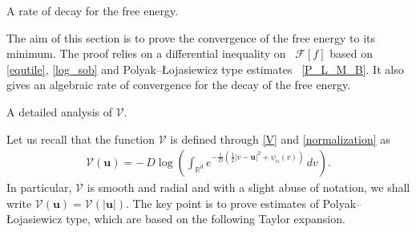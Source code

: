 \documentclass[reqno]{amsart} %
\begin{document}
\begin{section}{A rate of decay for the free energy.}

\label{sec:sec1}
The aim of this section is to prove the convergence of the free energy to its minimum. The proof relies on a differential inequality on ~$\mathcal{F}[f]$ based on ~ \eqref{equtile}, \eqref{log_sob} and Polyak–Łojasiewicz type estimates ~\eqref{P_L_M_B}. It also gives an algebraic rate of convergence for the decay of the free energy. 


\begin{subsection}{A detailed analysis of  \texorpdfstring{$\mathcal{V}$}{V}.}
    
Let us recall that the function $\mathcal{V}$ is defined through \eqref{V} and \eqref{normalization} as 
\begin{align}
\label{V2}
     \mathcal{V}(\mathbf{u})=-\,D\log\left( \int_{\mathbb{R}^d}e^{-\frac{1}{D}\left(\frac{1}{2}|v-\mathbf{u}|^2+ \psi_{\alpha}(v)\right)}\,dv\right).
\end{align}
In particular, $\mathcal{V}$ is smooth and radial and with a slight abuse of notation, we shall write $\mathcal{V}(\mathbf{u})=\mathcal{V}(|\mathbf{u}|)$. The key point is to prove estimates of Polyak–Łojasiewicz type, which are based on the following Taylor expansion.


\end{subsection}
\end{section}
\end{document}

